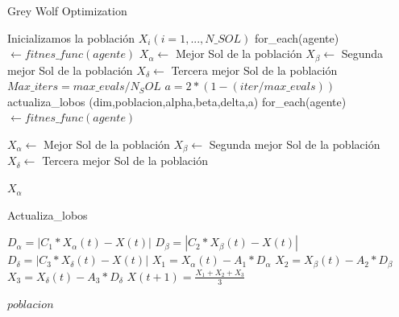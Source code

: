 \documentclass[a4paper, 12.5pt]{report}
\begin{document}
\begin{algorithm}[H]
    \caption{Grey Wolf Optimization}\label{alg:GWO}
    \begin{algorithmic}[1]
        \State Inicializamos la población $X_i (i=1,...,N\_SOL)$
        \State for\_each(agente) $ \gets fitnes\_func(agente)$
        \State $X_\alpha \gets$ Mejor Sol de la población
        \State $X_\beta \gets$ Segunda mejor Sol de la población
        \State $X_\delta \gets$ Tercera mejor Sol de la población
        \State $Max\_iters=max\_evals/N_SOL$
        \State $a=2*(1-(iter/max\_evals))$
        \State actualiza\_lobos (dim,poblacion,alpha,beta,delta,a)
        \State for\_each(agente) $ \gets fitnes\_func(agente)$

        \State $X_\alpha \gets$ Mejor Sol de la población
        \State $X_\beta \gets$ Segunda mejor Sol de la población
        \State $X_\delta \gets$ Tercera mejor Sol de la población


        \EndFor

        \Return $X_\alpha $
        \EndFunction


    \end{algorithmic}
\end{algorithm}


\begin{algorithm}[H]
    \caption{Actualiza\_lobos}\label{alg:AW}
    \begin{algorithmic}[1]

        \State $D_\alpha=|C_1*X_\alpha(t)-X(t)| $
        \State $D_\beta=|C_2*X_\beta(t)-X(t)| $
        \State $D_\delta=|C_3*X_\delta(t)-X(t)| $
        \State $X_1=X_\alpha(t)-A_1*D_\alpha$
        \State $X_2=X_\beta(t)-A_2*D_\beta$
        \State $X_3=X_\delta(t)-A_3*D_\delta$
        \State $X(t+1)=\frac{X_1+X_2+X_3}{3}$ 

        \EndFor

        \Return $poblacion$
        \EndFunction


    \end{algorithmic}
\end{algorithm}
\end{document}
